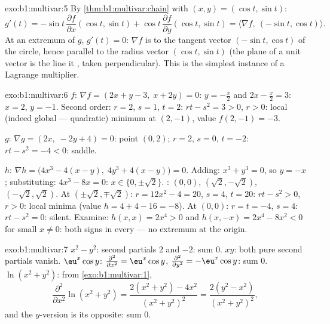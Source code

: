 \begin{solution}{exo:b1:multivar:5}
By \cref{thm:b1:multivar:chain} with $(x, y) = (\cos t, \sin t)$:
\[
g'(t) = -\sin t\,\frac{\partial f}{\partial x}(\cos t, \sin t)
+ \cos t\,\frac{\partial f}{\partial y}(\cos t, \sin t)
= \bigl\langle \nabla f,\ (-\sin t, \cos t)\bigr\rangle .
\]
At an extremum of $g$, $g'(t) = 0$: $\nabla f$ is  to the
tangent vector $(-\sin t, \cos t)$ of the circle, hence parallel to
the radius vector $(\cos t, \sin t)$ (the plane  of a unit vector is the line it , taken
perpendicular). This is the simplest instance of a Lagrange
multiplier.
\end{solution}

\begin{solution}{exo:b1:multivar:6}
$f$: $\nabla f = (2x + y - 3,\; x + 2y) = 0$: $y = -\frac x2$ and
$2x - \frac x2 = 3$: $x = 2$, $y = -1$. Second order: $r = 2$, $s =
1$, $t = 2$: $rt - s^2 = 3 > 0$, $r > 0$: local (indeed global ---
quadratic) minimum at $(2, -1)$, value $f(2,-1) = -3$.

$g$: $\nabla g = (2x,\; -2y + 4) = 0$: point $(0, 2)$; $r = 2$, $s
= 0$, $t = -2$: $rt - s^2 = -4 < 0$: saddle.

$h$: $\nabla h = \bigl(4x^3 - 4(x - y),\; 4y^3 + 4(x-y)\bigr) = 0$.
Adding: $x^3 + y^3 = 0$, so $y = -x$; substituting: $4x^3 - 8x = 0$:
$x \in \{0, \pm\sqrt2\}$. : $(0,0)$,
$(\sqrt2, -\sqrt2)$, $(-\sqrt2, \sqrt2)$.
At $(\pm\sqrt2, \mp\sqrt2)$: $r = 12x^2 - 4 = 20$, $s = 4$, $t =
20$: $rt - s^2 > 0$, $r > 0$: local minima (value $h = 4 + 4 - 16 =
-8$). At $(0,0)$: $r = t = -4$, $s = 4$: $rt - s^2 = 0$: silent.
Examine: $h(x, x) = 2x^4 > 0$ and $h(x, -x) = 2x^4 - 8x^2 < 0$ for
small $x \neq 0$: both signs in every  --- no extremum
at the origin.
\end{solution}

\begin{solution}{exo:b1:multivar:7}
$x^2 - y^2$: second partials $2$ and $-2$: sum $0$. $xy$: both pure
second partials vanish. $\eu^x\cos y$: $\frac{\partial^2}{\partial
x^2} = \eu^x\cos y$, $\frac{\partial^2}{\partial y^2} =
-\eu^x\cos y$: sum $0$. $\ln(x^2+y^2)$: from
\cref{exo:b1:multivar:1},
\[
\frac{\partial^2}{\partial x^2}\ln(x^2+y^2)
= \frac{2(x^2+y^2) - 4x^2}{(x^2+y^2)^2}
= \frac{2(y^2 - x^2)}{(x^2+y^2)^2},
\]
and the $y$-version is its opposite: sum $0$.
\end{solution}

